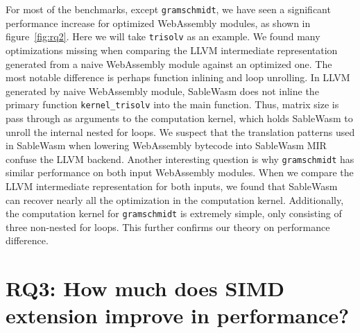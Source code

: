For most of the benchmarks, except \texttt{gramschmidt}, we have seen a significant performance increase for optimized WebAssembly modules, as shown in figure~\ref{fig:rq2}. Here we will take \texttt{trisolv} as an example. We found many optimizations missing when comparing the LLVM intermediate representation generated from a naive WebAssembly module against an optimized one. The most notable difference is perhaps function inlining and loop unrolling. In LLVM generated by naive WebAssembly module, SableWasm does not inline the primary function \texttt{kernel\_trisolv} into the main function. Thus, matrix size is pass through as arguments to the computation kernel, which holds SableWasm to unroll the internal nested for loops. We suspect that the translation patterns used in SableWasm when lowering WebAssembly bytecode into SableWasm MIR confuse the LLVM backend. Another interesting question is why \texttt{gramschmidt} has similar performance on both input WebAssembly modules. When we compare the LLVM intermediate representation for both inputs, we found that SableWasm can recover nearly all the optimization in the computation kernel. Additionally, the computation kernel for \texttt{gramschmidt} is extremely simple, only consisting of three non-nested for loops. This further confirms our theory on performance difference.

\section[RQ3: How much does SIMD extension improve in performance?]{
  {\large RQ3: How much does SIMD extension improve in performance?}}


